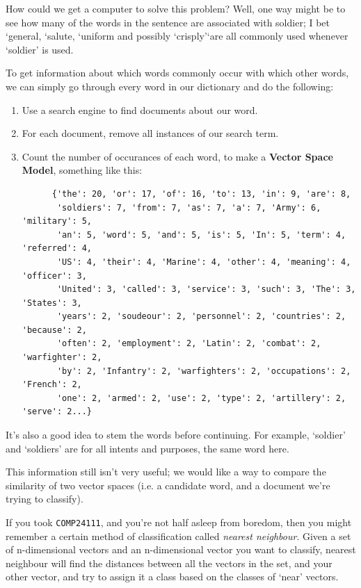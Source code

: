 How could we get a computer to solve this problem? Well, one way might be to see
how many of the words in the sentence are associated with soldier; I bet
`general, `salute, `uniform and possibly `crisply'`are all commonly used
whenever `soldier' is used.

To get information about which words commonly occur with which other words, we
can simply go through every word in our dictionary and do the following:

\begin{enumerate}
  \item Use a search engine to find documents about our word.
  \item For each document, remove all instances of our search term.
  \item Count the number of occurances of each word, to make a \textbf{Vector 
    Space Model}, something like this:
    \begin{verbatim}
      {'the': 20, 'or': 17, 'of': 16, 'to': 13, 'in': 9, 'are': 8,
       'soldiers': 7, 'from': 7, 'as': 7, 'a': 7, 'Army': 6, 'military': 5,
       'an': 5, 'word': 5, 'and': 5, 'is': 5, 'In': 5, 'term': 4, 'referred': 4,
       'US': 4, 'their': 4, 'Marine': 4, 'other': 4, 'meaning': 4, 'officer': 3,
       'United': 3, 'called': 3, 'service': 3, 'such': 3, 'The': 3, 'States': 3,
       'years': 2, 'soudeour': 2, 'personnel': 2, 'countries': 2, 'because': 2,
       'often': 2, 'employment': 2, 'Latin': 2, 'combat': 2, 'warfighter': 2,
       'by': 2, 'Infantry': 2, 'warfighters': 2, 'occupations': 2, 'French': 2,
       'one': 2, 'armed': 2, 'use': 2, 'type': 2, 'artillery': 2, 'serve': 2...}
    \end{verbatim}
\end{enumerate}

It's also a good idea to stem the words before continuing. For example,
`soldier' and `soldiers' are for all intents and purposes, the same word here.

This information still isn't very useful; we would like a way to compare the
similarity of two vector spaces (i.e. a candidate word, and a document we're
trying to classify).

If you took \texttt{COMP24111}, and you're not half asleep from boredom, then
you might remember a certain method of classification called \textit{nearest
neighbour}. Given a set of n-dimensional vectors and an n-dimensional vector you
want to classify, nearest neighbour will find the distances between all the
vectors in the set, and your other vector, and try to assign it a class based on
the classes of `near' vectors.

